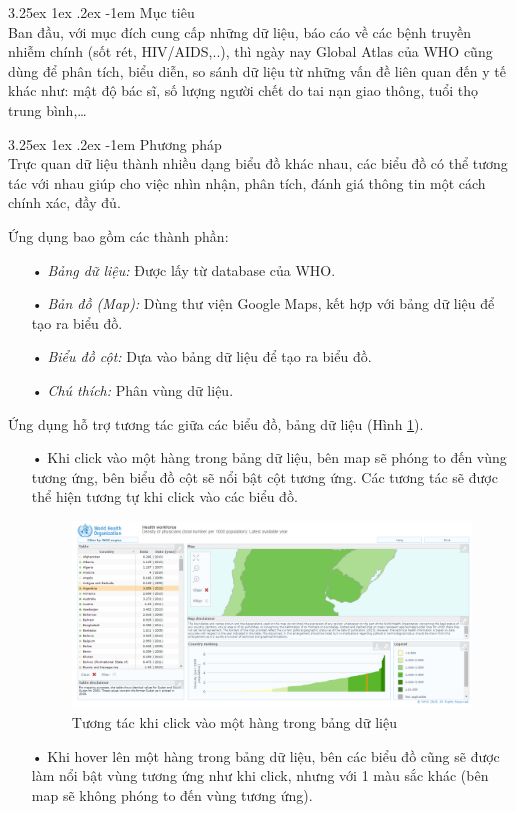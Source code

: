 \documentclass[12pt,a4paper,twoside]{article}
\makeatletter
\newcommand{\myparagraph}[1]{\paragraph{#1}\mbox{}\\} %
\renewcommand\paragraph{\@startsection{paragraph}{5}{\z@}%
  {3.25ex \@plus1ex \@minus.2ex}%
  {-1em}%
  {\normalfont\normalsize\bfseries}}
\makeatother
\begin{document}
\myparagraph{Mục tiêu}
Ban đầu, với mục đích cung cấp những dữ liệu, báo cáo về các bệnh truyền nhiễm chính (sốt rét, HIV/AIDS,..), thì ngày nay Global Atlas của WHO cũng dùng để phân tích, biểu diễn, so sánh dữ liệu từ những vấn đề liên quan đến y tế khác như: mật độ bác sĩ, số lượng người chết do tai nạn giao thông, tuổi thọ trung bình,… 

\myparagraph{Phương pháp}
Trực quan dữ liệu thành nhiều dạng biểu đồ khác nhau, các biểu đồ có thể tương tác với nhau giúp cho việc nhìn nhận, phân tích, đánh giá thông tin một cách chính xác, đầy đủ.

Ứng dụng\cite{ghaex} bao gồm các thành phần:
\begin{itemize}
\item[•] \emph{Bảng dữ liệu:} Được lấy từ database của WHO.
\item[•] \emph{Bản đồ (Map):} Dùng thư viện Google Maps, kết hợp với bảng dữ liệu để tạo ra biểu đồ.
\item[•] \emph{Biểu đồ cột:} Dựa vào bảng dữ liệu để tạo ra biểu đồ.
\item[•] \emph{Chú thích:} Phân vùng dữ liệu.
\end{itemize}

Ứng dụng hỗ trợ tương tác giữa các biểu đồ, bảng dữ liệu (Hình \ref{fig:clickatlas}).

\begin{itemize}
\item[•] Khi click vào một hàng trong bảng dữ liệu, bên map sẽ phóng to đến vùng tương ứng, bên biểu đồ cột sẽ nổi bật cột tương ứng. Các tương tác sẽ được thể hiện tương tự khi click vào các biểu đồ.

\begin{figure}[!h]
    \begin{center}
    \includegraphics[scale=.4]{image/clickatlas}
    \caption{Tương tác khi click vào một hàng trong bảng dữ liệu}
    \label{fig:clickatlas}
    \end{center}
\end{figure}

\item[•] Khi hover lên một hàng trong bảng dữ liệu, bên các biểu đồ cũng sẽ được làm nổi bật vùng tương ứng như khi click, nhưng với 1 màu sắc khác (bên map sẽ không phóng to đến vùng tương ứng).
\end{itemize}
\end{document}
